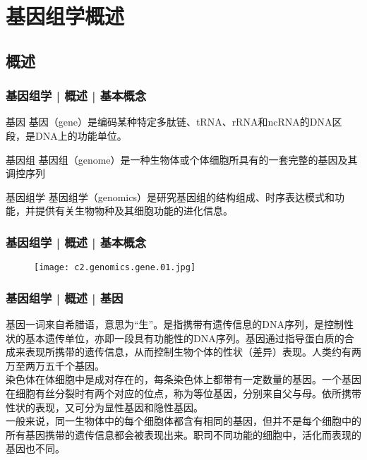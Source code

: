 \section{基因组学概述}
\subsection{概述}
\begin{frame}
  \frametitle{基因组学 | 概述 | 基本概念}
  \begin{block}{基因}
基因（gene）是编码某种特定多肽链、tRNA、rRNA和ncRNA的DNA区段，是DNA上的功能单位。
  \end{block}
  \pause
  \begin{block}{基因组}
 基因组（genome）是一种生物体或个体细胞所具有的一套完整的基因及其调控序列 
  \end{block}
  \pause
  \begin{block}{基因组学}
 基因组学（genomics）是研究基因组的结构组成、时序表达模式和功能，并提供有关生物物种及其细胞功能的进化信息。 
  \end{block}
\end{frame}

\begin{frame}
  \frametitle{基因组学 | 概述 | 基本概念}
  \begin{figure}
    \centering
    \texttt{[image: c2.genomics.gene.01.jpg]}
  \end{figure}
\end{frame}

\begin{frame}
  \frametitle{基因组学 | 概述 | 基因}
基因一词来自希腊语，意思为“生”。是指携带有遗传信息的DNA序列，是控制性状的基本遗传单位，亦即一段具有功能性的DNA序列。基因通过指导蛋白质的合成来表现所携带的遗传信息，从而控制生物个体的性状（差异）表现。人类约有两万至两万五千个基因。\\
\vspace{1em}
染色体在体细胞中是成对存在的，每条染色体上都带有一定数量的基因。一个基因在细胞有丝分裂时有两个对应的位点，称为等位基因，分别来自父与母。依所携带性状的表现，又可分为显性基因和隐性基因。\\
\vspace{1em}
一般来说，同一生物体中的每个细胞体都含有相同的基因，但并不是每个细胞中的所有基因携带的遗传信息都会被表现出来。职司不同功能的细胞中，活化而表现的基因也不同。
\end{frame}

